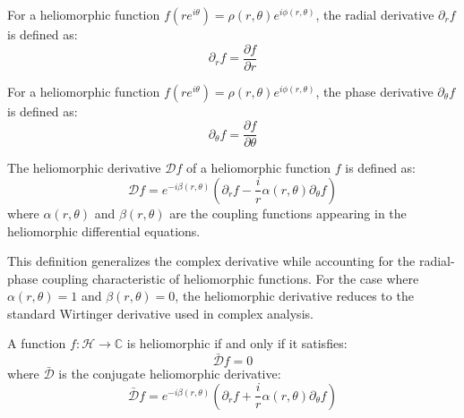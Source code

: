 \begin{definition}
For a heliomorphic function $f(re^{i\theta}) = \rho(r,\theta)e^{i\phi(r,\theta)}$, the radial derivative $\partial_r f$ is defined as:
\begin{equation}
\partial_r f = \frac{\partial f}{\partial r}
\end{equation}
\end{definition}

\begin{definition}
For a heliomorphic function $f(re^{i\theta}) = \rho(r,\theta)e^{i\phi(r,\theta)}$, the phase derivative $\partial_\theta f$ is defined as:
\begin{equation}
\partial_\theta f = \frac{\partial f}{\partial \theta}
\end{equation}
\end{definition}

\begin{definition}
The heliomorphic derivative $\mathcal{D}f$ of a heliomorphic function $f$ is defined as:
\begin{equation}
\mathcal{D}f = e^{-i\beta(r,\theta)}\left(\partial_r f - \frac{i}{r}\alpha(r,\theta)\partial_\theta f\right)
\end{equation}
where $\alpha(r,\theta)$ and $\beta(r,\theta)$ are the coupling functions appearing in the heliomorphic differential equations.
\end{definition}

This definition generalizes the complex derivative while accounting for the radial-phase coupling characteristic of heliomorphic functions. For the case where $\alpha(r,\theta) = 1$ and $\beta(r,\theta) = 0$, the heliomorphic derivative reduces to the standard Wirtinger derivative used in complex analysis.

\begin{theorem}
A function $f: \mathcal{H} \rightarrow \mathbb{C}$ is heliomorphic if and only if it satisfies:
\begin{equation}
\bar{\mathcal{D}}f = 0
\end{equation}
where $\bar{\mathcal{D}}$ is the conjugate heliomorphic derivative:
\begin{equation}
\bar{\mathcal{D}}f = e^{-i\beta(r,\theta)}\left(\partial_r f + \frac{i}{r}\alpha(r,\theta)\partial_\theta f\right)
\end{equation}
\end{theorem}

